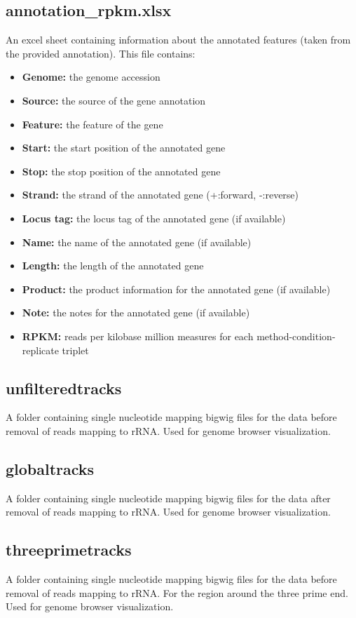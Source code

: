 \documentclass[10pt,a4paper]{article}
\begin{document}
\subsection*{annotation\_rpkm.xlsx}
An excel sheet containing information about the annotated features (taken from the provided annotation). This file contains: 
\begin{itemize}
\item \textbf{Genome:} the genome accession 
\item \textbf{Source:} the source of the gene annotation
\item \textbf{Feature:} the feature of the gene
\item \textbf{Start:} the start position of the annotated gene
\item \textbf{Stop:} the stop position of the annotated gene
\item \textbf{Strand:} the strand of the annotated gene (+:forward, -:reverse)
\item \textbf{Locus tag:} the locus tag of the annotated gene (if available)
\item \textbf{Name:} the name of the annotated gene (if available)
\item \textbf{Length:} the length of the annotated gene
\item \textbf{Product:} the product information for the annotated gene (if available)
\item \textbf{Note:} the notes for the annotated gene (if available)
\item \textbf{RPKM:} reads per kilobase million measures for each method-condition-replicate triplet
\end{itemize}
\subsection*{unfilteredtracks}
A folder containing single nucleotide mapping bigwig files for the data before removal of reads mapping to rRNA. Used for genome browser visualization.
\subsection*{globaltracks}
A folder containing single nucleotide mapping bigwig files for the data after removal of reads mapping to rRNA. Used for genome browser visualization.
\subsection*{threeprimetracks}
A folder containing single nucleotide mapping bigwig files for the data before removal of reads mapping to rRNA. For the region around the three prime end. Used for genome browser visualization.
\end{document}
